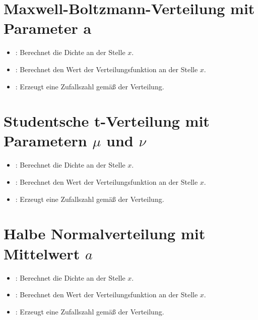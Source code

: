 \section{Maxwell-Boltzmann-Verteilung mit Parameter a}

\begin{itemize}

\item
{}:
Berechnet die Dichte an der Stelle $x$.

\item
{}:
Berechnet den Wert der Verteilungsfunktion an der Stelle $x$.

\item
{}:
Erzeugt eine Zufallszahl gemäß der Verteilung.

\end{itemize}



\section{Studentsche t-Verteilung mit Parametern \texorpdfstring{$\mu$}{mu} und \texorpdfstring{$\nu$}{nu}}

\begin{itemize}

\item
{}:
Berechnet die Dichte an der Stelle $x$.

\item
{}:
Berechnet den Wert der Verteilungsfunktion an der Stelle $x$.

\item
{}:
Erzeugt eine Zufallszahl gemäß der Verteilung.

\end{itemize}



\section{Halbe Normalverteilung mit Mittelwert \texorpdfstring{$a$}{a}}

\begin{itemize}

\item
{}:
Berechnet die Dichte an der Stelle $x$.

\item
{}:
Berechnet den Wert der Verteilungsfunktion an der Stelle $x$.

\item
{}:
Erzeugt eine Zufallszahl gemäß der Verteilung.

\end{itemize}



